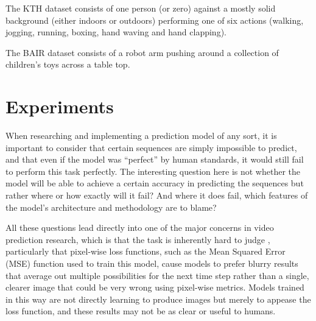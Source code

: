\documentclass{scrartcl}
\begin{document}
The KTH dataset consists of one person (or zero) against a mostly solid
background (either indoors or outdoors) performing one of six actions (walking,
jogging, running, boxing, hand waving and hand clapping).

The BAIR dataset consists of a robot arm pushing around a collection of
children's toys across a table top.

\newpage
\section{Experiments}
\label{sec:experiments}


When researching and implementing a prediction model of any sort, it is
important to consider that certain sequences are simply impossible to predict,
and that even if the model was ``perfect'' by human standards, it would still
fail to perform this task perfectly. The interesting question here is not
whether the model will be able to achieve a certain accuracy in predicting the
sequences but rather where or how exactly will it fail? And where it does fail,
which features of the model's architecture and methodology are to blame?

All these questions lead directly into one of the major concerns in video
prediction research, which is that the task is inherently hard to judge
\cite{video_prediction_survey}, particularly that pixel-wise loss functions,
such as the Mean Squared Error (MSE) function used to train this model, cause
models to prefer blurry results that average out multiple possibilities for the
next time step rather than a single, clearer image that could be very wrong
using pixel-wise metrics. Models trained in this way are not directly learning
to produce images but merely to appease the loss function, and these results
may not be as clear or useful to humans.
\end{document}
